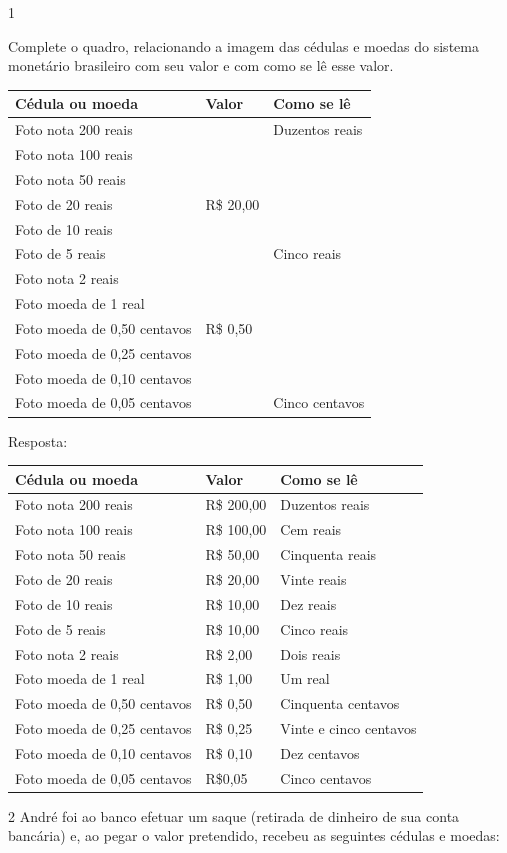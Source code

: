 \begin{escolha}
{

\num{1}

Complete o quadro, relacionando a imagem das cédulas e moedas do
sistema monetário brasileiro com seu valor e com como se lê esse valor.


\begin{longtable}[]{@{}lll@{}}
\toprule
Cédula ou moeda & Valor & Como se lê\tabularnewline
\midrule
\endhead
Foto nota 200 reais & & Duzentos reais\tabularnewline
Foto nota 100 reais & &\tabularnewline
Foto nota 50 reais & &\tabularnewline
Foto de 20 reais & R\$ 20,00 &\tabularnewline
Foto de 10 reais & &\tabularnewline
Foto de 5 reais & & Cinco reais\tabularnewline
Foto nota 2 reais & &\tabularnewline
Foto moeda de 1 real & &\tabularnewline
Foto moeda de 0,50 centavos & R\$ 0,50 &\tabularnewline
Foto moeda de 0,25 centavos & &\tabularnewline
Foto moeda de 0,10 centavos & &\tabularnewline
Foto moeda de 0,05 centavos & & Cinco centavos\tabularnewline
\bottomrule
\end{longtable}

Resposta:

\begin{longtable}[]{@{}lll@{}}
\toprule
Cédula ou moeda & Valor & Como se lê\tabularnewline
\midrule
\endhead
Foto nota 200 reais & R\$ 200,00 & Duzentos reais\tabularnewline
Foto nota 100 reais & R\$ 100,00 & Cem reais\tabularnewline
Foto nota 50 reais & R\$ 50,00 & Cinquenta reais\tabularnewline
Foto de 20 reais & R\$ 20,00 & Vinte reais\tabularnewline
Foto de 10 reais & R\$ 10,00 & Dez reais\tabularnewline
Foto de 5 reais & R\$ 10,00 & Cinco reais\tabularnewline
Foto nota 2 reais & R\$ 2,00 & Dois reais\tabularnewline
Foto moeda de 1 real & R\$ 1,00 & Um real\tabularnewline
Foto moeda de 0,50 centavos & R\$ 0,50 & Cinquenta
centavos\tabularnewline
Foto moeda de 0,25 centavos & R\$ 0,25 & Vinte e cinco
centavos\tabularnewline
Foto moeda de 0,10 centavos & R\$ 0,10 & Dez centavos\tabularnewline
Foto moeda de 0,05 centavos & R\$0,05 & Cinco centavos\tabularnewline
\bottomrule
\end{longtable}

\num{2} André foi ao banco efetuar um saque (retirada de dinheiro de sua conta
bancária) e, ao pegar o valor pretendido, recebeu as seguintes cédulas e moedas:


}
\end{escolha}
